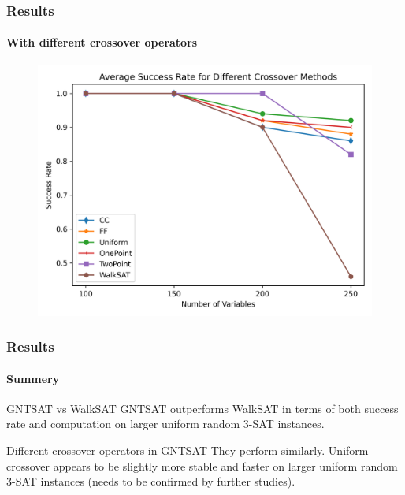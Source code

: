 \begin{frame}
\frametitle{Results}
\framesubtitle{With different crossover operators}
\begin{figure}[htpb]
	\centering
	\includegraphics[scale=0.13]{AverageSR.png}
\end{figure}
\end{frame}

\begin{frame}
\frametitle{Results}
\framesubtitle{Summery}
\begin{alertblock}{GNTSAT vs WalkSAT}
	GNTSAT outperforms WalkSAT in terms of both success
	rate and computation on larger uniform random 3-SAT instances.
\end{alertblock}

\begin{alertblock}{Different crossover operators in GNTSAT}
	They perform similarly. Uniform crossover appears to
	be slightly more stable and faster on larger uniform random 3-SAT instances
	(needs to be confirmed by further studies).
\end{alertblock}

\end{frame}
